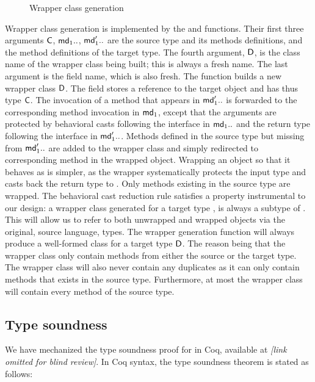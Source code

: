 \documentclass{tex/llncs}
\begin{document}
\begin{figure}[!b]
\vspace{-5mm}

\hrulefill
\vspace{-2mm}
\caption{Wrapper class generation}\label{w}\end{figure}


Wrapper class generation is implemented by the  and 
functions. Their first three arguments \(\C\), \(\md[1]..\), \(\mdp[1]..\)
are the source type and its methods definitions, and the method definitions
of the target type. The fourth argument, \(\D\), is the class name of the
wrapper class being built; this is always a fresh name. The last argument is
the \that field name, which is also fresh.  The function builds a new
wrapper class \(\D\).  The field \that stores a reference to the target
object and has thus type \(\C\).  The invocation of a method that appears in
\(\mdp[1]..\) is forwarded to the corresponding method invocation in
\(\md[1]\), except that the arguments are protected by behavioral casts
following the interface in \(\md[1]..\) and the return type following the
interface in \(\mdp[1]..\).  Methods defined in the source type but missing
from \(\mdp[1]..\) are added to the wrapper class and simply redirected to
corresponding method in the wrapped object.  Wrapping an object so that it
behaves as \any is simpler, as the wrapper systematically protects the input
type and casts back the return type to \any. Only methods existing in the
source type are wrapped. The behavioral cast reduction rule satisfies a
property instrumental to our design: a wrapper class generated for a target
type \D, is always a subtype of \D.  This will allow us to refer to both
unwrapped and wrapped objects via the original, source language, types. The
wrapper generation function will always produce a well-formed class for a
target type $\D$. The reason being that the wrapper class only contain
methods from either the source or the target type. The wrapper class will
also never contain any duplicates as it can only contain methods that exists
in the source type.  Furthermore, at most the wrapper class will contain
every method of the source type.

\newpage

\subsection{Type soundness} 
We have mechanized the type soundness proof for \kafka in Coq, 
available at \emph{[link omitted for blind review]}. In Coq syntax, the
\kafka type soundness theorem is stated as follows:
\end{document}
